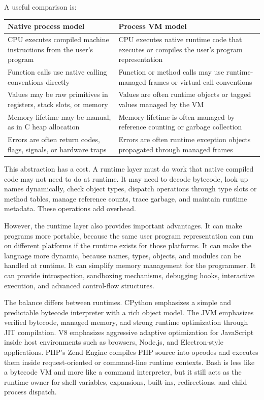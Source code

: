 \documentclass[a4paper,twoside]{report}
\begin{document}
A useful comparison is:

\begin{center}
\begin{tabular}{|p{}|p{}|}
\hline
\textbf{Native process model} & \textbf{Process VM model} \\
\hline
CPU executes compiled machine instructions from the user's program & CPU executes native runtime code that executes or compiles the user's program representation \\
\hline
Function calls use native calling conventions directly & Function or method calls may use runtime-managed frames or virtual call conventions \\
\hline
Values may be raw primitives in registers, stack slots, or memory & Values are often runtime objects or tagged values managed by the VM \\
\hline
Memory lifetime may be manual, as in C heap allocation & Memory lifetime is often managed by reference counting or garbage collection \\
\hline
Errors are often return codes, flags, signals, or hardware traps & Errors are often runtime exception objects propagated through managed frames \\
\hline
\end{tabular}
\end{center}

This abstraction has a cost. A runtime layer must do work that native compiled code may not need to do at runtime. It may need to decode bytecode, look up names dynamically, check object types, dispatch operations through type slots or method tables, manage reference counts, trace garbage, and maintain runtime metadata. These operations add overhead.

However, the runtime layer also provides important advantages. It can make programs more portable, because the same user program representation can run on different platforms if the runtime exists for those platforms. It can make the language more dynamic, because names, types, objects, and modules can be handled at runtime. It can simplify memory management for the programmer. It can provide introspection, sandboxing mechanisms, debugging hooks, interactive execution, and advanced control-flow structures.

The balance differs between runtimes. CPython emphasizes a simple and predictable bytecode interpreter with a rich object model. The JVM emphasizes verified bytecode, managed memory, and strong runtime optimization through JIT compilation. V8 emphasizes aggressive adaptive optimization for JavaScript inside host environments such as browsers, Node.js, and Electron-style applications. PHP's Zend Engine compiles PHP source into opcodes and executes them inside request-oriented or command-line runtime contexts. Bash is less like a bytecode VM and more like a command interpreter, but it still acts as the runtime owner for shell variables, expansions, built-ins, redirections, and child-process dispatch.
\end{document}
